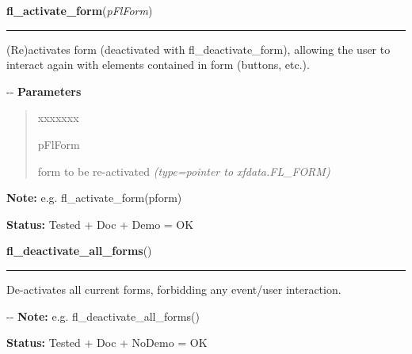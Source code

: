 \hspace{.8\funcindent}\begin{boxedminipage}{\funcwidth}

    \raggedright \textbf{fl\_activate\_form}(\textit{pFlForm})

    \vspace{-1.5ex}

    \rule{\textwidth}{0.5\fboxrule}
\setlength{\parskip}{2ex}

(Re)activates form (deactivated with fl\_deactivate\_form), allowing the
user to interact again with elements contained in form (buttons, etc.).

-{}-
\setlength{\parskip}{1ex}
      \textbf{Parameters}
      \vspace{-1ex}

      \begin{quote}
        \begin{Ventry}{xxxxxxx}

          \item[pFlForm]


form to be re-activated
            {\it (type=pointer to xfdata.FL\_FORM)}

        \end{Ventry}

      \end{quote}

\textbf{Note:} 
e.g. fl\_activate\_form(pform)


\textbf{Status:} 
Tested + Doc + Demo = OK


    \end{boxedminipage}

    \label{xformslib:flbasic:fl_deactivate_all_forms}

    \vspace{0.5ex}

\hspace{.8\funcindent}\begin{boxedminipage}{\funcwidth}

    \raggedright \textbf{fl\_deactivate\_all\_forms}()

    \vspace{-1.5ex}

    \rule{\textwidth}{0.5\fboxrule}
\setlength{\parskip}{2ex}

De-activates all current forms, forbidding any event/user interaction.

-{}-
\setlength{\parskip}{1ex}
\textbf{Note:} 
e.g. fl\_deactivate\_all\_forms()


\textbf{Status:} 
Tested + Doc + NoDemo = OK


    \end{boxedminipage}

